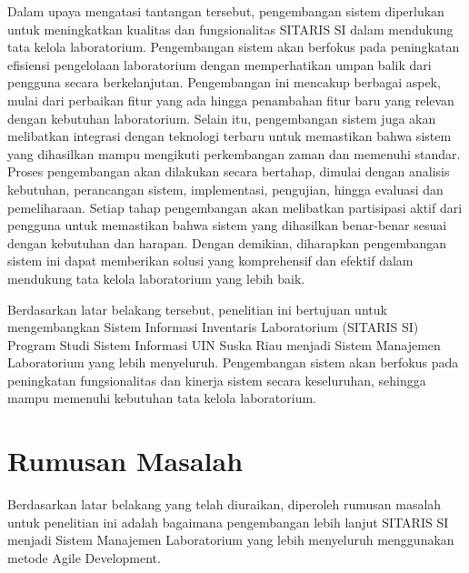 Dalam upaya mengatasi tantangan tersebut, pengembangan sistem diperlukan untuk meningkatkan kualitas dan fungsionalitas SITARIS SI dalam mendukung tata kelola laboratorium. Pengembangan sistem akan berfokus pada peningkatan efisiensi pengelolaan laboratorium dengan memperhatikan umpan balik dari pengguna secara berkelanjutan. Pengembangan ini mencakup berbagai aspek, mulai dari perbaikan fitur yang ada hingga penambahan fitur baru yang relevan dengan kebutuhan laboratorium. Selain itu, pengembangan sistem juga akan melibatkan integrasi dengan teknologi terbaru untuk memastikan bahwa sistem yang dihasilkan mampu mengikuti perkembangan zaman dan memenuhi standar. Proses pengembangan akan dilakukan secara bertahap, dimulai dengan analisis kebutuhan, perancangan sistem, implementasi, pengujian, hingga evaluasi dan pemeliharaan. Setiap tahap pengembangan akan melibatkan partisipasi aktif dari pengguna untuk memastikan bahwa sistem yang dihasilkan benar-benar sesuai dengan kebutuhan dan harapan. Dengan demikian, diharapkan pengembangan sistem ini dapat memberikan solusi yang komprehensif dan efektif dalam mendukung tata kelola laboratorium yang lebih baik.

Berdasarkan latar belakang tersebut, penelitian ini bertujuan untuk mengembangkan Sistem Informasi Inventaris Laboratorium (SITARIS SI) Program Studi Sistem Informasi UIN Suska Riau menjadi Sistem Manajemen Laboratorium yang lebih menyeluruh. Pengembangan sistem akan berfokus pada peningkatan fungsionalitas dan kinerja sistem secara keseluruhan, sehingga mampu memenuhi kebutuhan tata kelola laboratorium.
\section{Rumusan Masalah}
Berdasarkan latar belakang yang telah diuraikan, diperoleh rumusan masalah untuk penelitian ini adalah bagaimana pengembangan lebih lanjut SITARIS SI menjadi Sistem Manajemen Laboratorium yang lebih menyeluruh menggunakan metode Agile Development.

